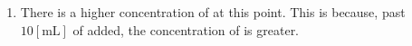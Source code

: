 \documentclass[12pt]{article}
\begin{document}
\begin{enumerate}
\begin{enumerate}
\begin{enumerate}
        \end{enumerate}

      \item There is a higher concentration of  at this point. This is because, past $10[\si{\milli\liter}]$ of  added, the concentration of  is greater.

    \end{enumerate}

\end{enumerate}
\end{document}
